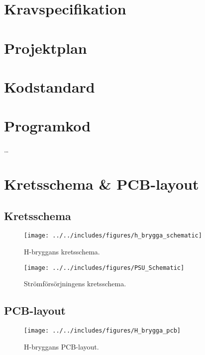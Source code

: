 \appendix
\section{Kravspecifikation}
\label{apx:Kravspec}


\section{Projektplan}
\label{apx:Projektplan}


\section{Kodstandard}
\label{apx:Kodstandard}




\section{Programkod}
\ldots

\section{Kretsschema \& PCB-layout}
\subsection{Kretsschema}
\begin{landscape}
\begin{figure}[htbp!]
\centering
\texttt{[image: ../../includes/figures/h\_brygga\_schematic]}
\caption{H-bryggans kretsschema.}
\label{fig:appendix_h_brygga_schema}
\end{figure}
\end{landscape}

\begin{landscape}
\begin{figure}[htbp!]
\centering
\texttt{[image: ../../includes/figures/PSU\_Schematic]}
\caption{Strömförsörjningens kretsschema.}
\label{fig:appendix_PSU_schema}
\end{figure}
\end{landscape}

\subsection{PCB-layout}
\begin{figure}[htbp!]
\centering
\texttt{[image: ../../includes/figures/H\_brygga\_pcb]}
\caption{H-bryggans PCB-layout.}
\label{fig:appendix_pcb_layout}
\end{figure}

